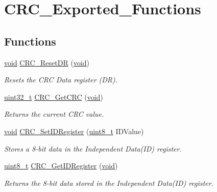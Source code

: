 \hypertarget{group___c_r_c___exported___functions}{}\section{C\+R\+C\+\_\+\+Exported\+\_\+\+Functions}
\label{group___c_r_c___exported___functions}
\subsection*{Functions}
\begin{DoxyCompactItemize}
\item 
\hyperlink{usb__devapi_8h_afabf60e7f57651d6d595a02c75f07cd0}{void} \hyperlink{group___c_r_c___exported___functions_ga506467d5ef873a5a4ade4ae83cb110f6}{C\+R\+C\+\_\+\+Reset\+DR} (\hyperlink{usb__devapi_8h_afabf60e7f57651d6d595a02c75f07cd0}{void})
\begin{DoxyCompactList}\small\item\em Resets the C\+RC Data register (DR). \end{DoxyCompactList}\item 
\hyperlink{_p_e___types_8h_a33594304e786b158f3fb30289278f5af}{uint32\+\_\+t} \hyperlink{group___c_r_c___exported___functions_gab62db4561b0558f3c8ed53887fe7de8b}{C\+R\+C\+\_\+\+Get\+C\+RC} (\hyperlink{usb__devapi_8h_afabf60e7f57651d6d595a02c75f07cd0}{void})
\begin{DoxyCompactList}\small\item\em Returns the current C\+RC value. \end{DoxyCompactList}\item 
\hyperlink{usb__devapi_8h_afabf60e7f57651d6d595a02c75f07cd0}{void} \hyperlink{group___c_r_c___exported___functions_ga769c9a42be57b972ae61bbada0f2e46a}{C\+R\+C\+\_\+\+Set\+I\+D\+Register} (\hyperlink{_p_e___types_8h_aba7bc1797add20fe3efdf37ced1182c5}{uint8\+\_\+t} I\+D\+Value)
\begin{DoxyCompactList}\small\item\em Stores a 8-\/bit data in the Independent Data(\+I\+D) register. \end{DoxyCompactList}\item 
\hyperlink{_p_e___types_8h_aba7bc1797add20fe3efdf37ced1182c5}{uint8\+\_\+t} \hyperlink{group___c_r_c___exported___functions_gaf869f6e9c3ca0ae0822cfad1abea7e5f}{C\+R\+C\+\_\+\+Get\+I\+D\+Register} (\hyperlink{usb__devapi_8h_afabf60e7f57651d6d595a02c75f07cd0}{void})
\begin{DoxyCompactList}\small\item\em Returns the 8-\/bit data stored in the Independent Data(\+I\+D) register. \end{DoxyCompactList}\end{DoxyCompactItemize}


